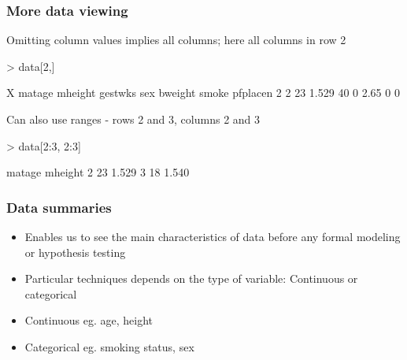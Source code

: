 \documentclass{beamer}
\begin{document}
\begin{frame}[fragile]\frametitle{More data viewing}
Omitting column values implies all columns; here all columns in row 2
\begin{Schunk}
\begin{Sinput}
> data[2,]
\end{Sinput}
\begin{Soutput}
  X matage mheight gestwks sex bweight smoke pfplacen
2 2     23   1.529      40   0    2.65     0        0
\end{Soutput}
\end{Schunk}
Can also use ranges - rows 2 and 3, columns 2 and 3
\begin{Schunk}
\begin{Sinput}
> data[2:3, 2:3]
\end{Sinput}
\begin{Soutput}
  matage mheight
2     23   1.529
3     18   1.540
\end{Soutput}
\end{Schunk}
\end{frame}

\begin{frame}[fragile]\frametitle{Data summaries}
\begin{itemize}
  \item Enables us to see the main characteristics of data before any formal modeling or hypothesis testing
  \item Particular techniques depends on the type of variable: Continuous or categorical
  \item Continuous eg. age, height
  \item Categorical eg. smoking status, sex
\end{itemize}
\end{frame}
\end{document}

